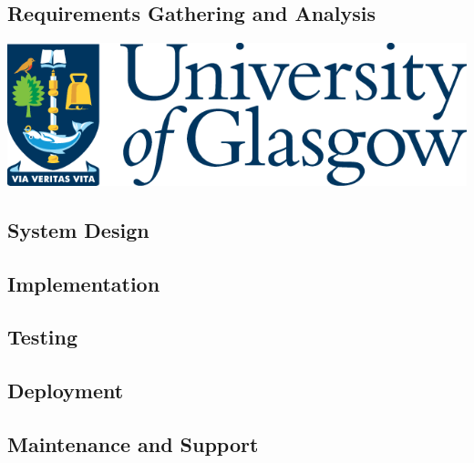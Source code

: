 \subsection{Requirements Gathering and Analysis}
\lipsum[4]

\includegraphics[width=\textwidth]{./images/UofG.png} %

\subsection{System Design}
\lipsum[5]

\subsection{Implementation}
\lipsum[6]

\subsection{Testing}
\lipsum[7]

\subsection{Deployment}
\lipsum[8]

\subsection{Maintenance and Support}
\lipsum[9]
